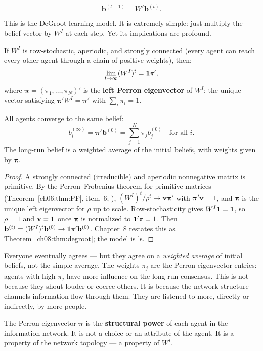 \documentclass[../structural_economics_book.tex]{subfiles}
\begin{document}
\begin{equation}\label{ch05:eq:DeGroot}
\mathbf{b}^{(t+1)} = W^I \mathbf{b}^{(t)}.
\end{equation}

This is the DeGroot learning model. It is extremely simple: just multiply the belief vector by $W^I$ at each step. Yet its implications are profound.

\begin{proposition}\label{ch05:prop:DeGroot}
If $W^I$ is row-stochastic, aperiodic, and strongly connected (every agent can reach every other agent through a chain of positive weights), then:
\begin{equation}\label{ch05:eq:DeGroot_limit}
\lim_{t \to \infty} (W^I)^t = \mathbf{1} \pi',
\end{equation}
where $\boldsymbol{\pi} = (\pi_1, \ldots, \pi_N)'$ is the \textbf{left Perron eigenvector} of $W^I$: the unique vector satisfying $\boldsymbol{\pi}' W^I = \boldsymbol{\pi}'$ with $\sum_i \pi_i = 1$.

All agents converge to the same belief:
\begin{equation}\label{ch05:eq:consensus}
b_i^{(\infty)} = \boldsymbol{\pi}'\mathbf{b}^{(0)} = \sum_{j=1}^N \pi_j b_j^{(0)} \quad \text{for all } i.
\end{equation}
The long-run belief is a weighted average of the initial beliefs, with weights given by $\boldsymbol{\pi}$.
\end{proposition}

\begin{proof}
A strongly connected (irreducible) and aperiodic nonnegative matrix is primitive. By the Perron--Frobenius theorem for primitive matrices (Theorem~\ref{ch06:thm:PF}, item~6; \citealp[Thms.~1.1--1.2]{seneta2006nonnegative}), $(W^I)^t/\rho^t \to \mathbf{v}\boldsymbol{\pi}'$ with $\boldsymbol{\pi}'\mathbf{v} = 1$, and $\boldsymbol{\pi}$ is the unique left eigenvector for $\rho$ up to scale. Row-stochasticity gives $W^I\mathbf{1} = \mathbf{1}$, so $\rho = 1$ and $\mathbf{v} = \mathbf{1}$ once $\boldsymbol{\pi}$ is normalized to $\mathbf{1}'\pi = 1$. Then $\mathbf{b}^{(t)} = (W^I)^t\mathbf{b}^{(0)} \to \mathbf{1}\pi'\mathbf{b}^{(0)}$. Chapter~8 restates this as Theorem~\ref{ch08:thm:degroot}; the model is \citet{degroot1974reaching}'s.
\end{proof}

\begin{intuition}
Everyone eventually agrees --- but they agree on a \textit{weighted average} of initial beliefs, not the simple average. The weights $\pi_j$ are the Perron eigenvector entries: agents with high $\pi_j$ have more influence on the long-run consensus. This is not because they shout louder or coerce others. It is because the network structure channels information flow through them. They are listened to more, directly or indirectly, by more people.

The Perron eigenvector $\boldsymbol{\pi}$ is the \textbf{structural power} of each agent in the information network. It is not a choice or an attribute of the agent. It is a property of the network topology --- a property of $W^I$.
\end{intuition}
\end{document}
